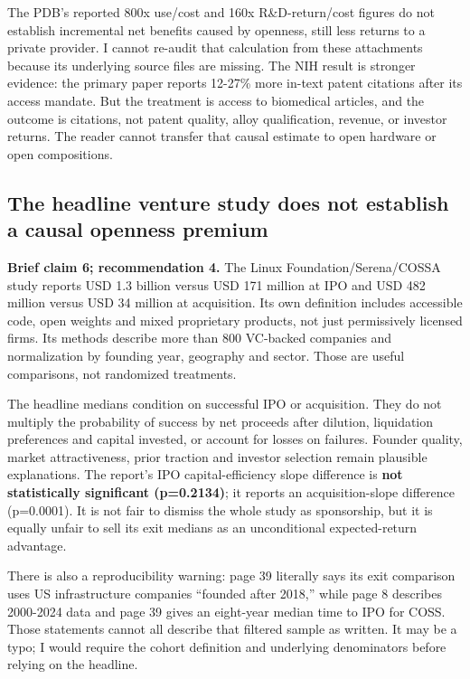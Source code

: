 \documentclass{article}
\begin{document}
The PDB's reported 800x use/cost and 160x R\&D-return/cost figures do
not establish incremental net benefits caused by openness, still less
returns to a private provider. I cannot re-audit that calculation from
these attachments because its underlying source files are missing. The
NIH result is stronger evidence: the primary paper reports 12-27\% more
in-text patent citations after its access mandate. But the treatment is
access to biomedical articles, and the outcome is citations, not patent
quality, alloy qualification, revenue, or investor returns. The reader
cannot transfer that causal estimate to open hardware or open
compositions. \citep{Bryan2021}

\subsection{The headline venture study does not establish a causal
openness
premium}\label{the-headline-venture-study-does-not-establish-a-causal-openness-premium}

\textbf{Brief claim 6; recommendation 4.} The Linux
Foundation/Serena/COSSA study reports USD 1.3 billion versus USD 171
million at IPO and USD 482 million versus USD 34 million at acquisition.
Its own definition includes accessible code, open weights and mixed
proprietary products, not just permissively licensed firms. Its methods
describe more than 800 VC-backed companies and normalization by founding
year, geography and sector. Those are useful comparisons, not randomized
treatments. \citep[pp.~8--9, 39--41]{Boysel2025State}

The headline medians condition on successful IPO or acquisition. They do
not multiply the probability of success by net proceeds after dilution,
liquidation preferences and capital invested, or account for losses on
failures. Founder quality, market attractiveness, prior traction and
investor selection remain plausible explanations. The report's IPO
capital-efficiency slope difference is \textbf{not statistically
significant (p=0.2134)}; it reports an acquisition-slope difference
(p=0.0001). It is not fair to dismiss the whole study as sponsorship,
but it is equally unfair to sell its exit medians as an unconditional
expected-return advantage.

There is also a reproducibility warning: page 39 literally says its exit
comparison uses US infrastructure companies ``founded after 2018,''
while page 8 describes 2000-2024 data and page 39 gives an eight-year
median time to IPO for COSS. Those statements cannot all describe that
filtered sample as written. It may be a typo; I would require the cohort
definition and underlying denominators before relying on the headline.
\citep{Boysel2025State}
\end{document}

